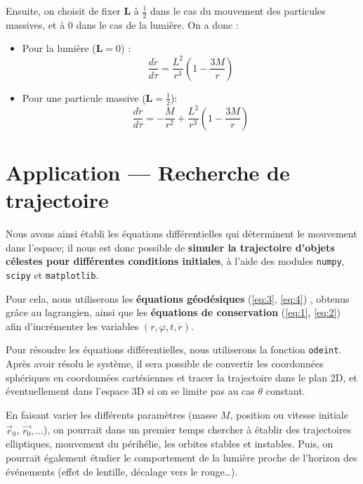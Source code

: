 \documentclass{article}
\begin{document}
Ensuite, on choisit de fixer $\mathbf{L}$ à $\frac{1}{2}$ dans le cas du mouvement des particules massives, et à $0$ dans le cas de la lumière. On a donc :
\begin{itemize}[label=\textendash]
    \item Pour la lumière ($\mathbf L=0$) :
    \begin{equation}\label{eq:3}
        \frac{d\dot r}{d\tau}=\frac{L^2}{r^3}\left(1-\frac{3M}{r}\right)
    \end{equation}
    \item Pour une particule massive ($\mathbf L=\frac{1}{2}$): 
    \begin{equation}\label{eq:4}\frac{d\dot r}{d\tau}=-\frac{M}{r^2}+\frac{L^2}{r^3}\left(1-\frac{3M}{r}\right)\end{equation}

\end{itemize}

\section{Application — Recherche de trajectoire}
Nous avons ainsi établi les équations différentielles qui déterminent le mouvement dans l’espace; il nous est donc possible de \textbf{simuler la trajectoire d'objets célestes pour différentes conditions initiales}, à l'aide des modules \texttt{numpy}, \texttt{scipy} et \texttt{matplotlib}. 

Pour cela, nous utiliserons les \textbf{équations géodésiques} (\ref{eq:3}, \ref{eq:4}) , obtenus grâce au lagrangien, ainsi que les \textbf{équations de conservation} (\ref{eq:1}, \ref{eq:2}) afin d'incrémenter les variables $(r,\varphi,t,\dot r)$. 

Pour résoudre les équations différentielles, nous utiliserons la fonction \texttt{odeint}. Après avoir résolu le système, il sera possible de convertir les coordonnées sphériques en coordonnées cartésiennes et tracer la trajectoire dans le plan 2D, et éventuellement dans l'espace 3D si on se limite pas au cas $\theta$ constant. 

En faisant varier les différents paramètres (masse $M$, position ou vitesse initiale $\vec r_0$, $\dot{\vec{r_0}},\dots$), on pourrait dans un premier temps chercher à établir des trajectoires elliptiques, mouvement du périhélie, les orbites stables et instables. Puis, on pourrait également étudier le comportement de la lumière proche de l'horizon des événements (effet de lentille, décalage vers le rouge\dots). 
\end{document}
